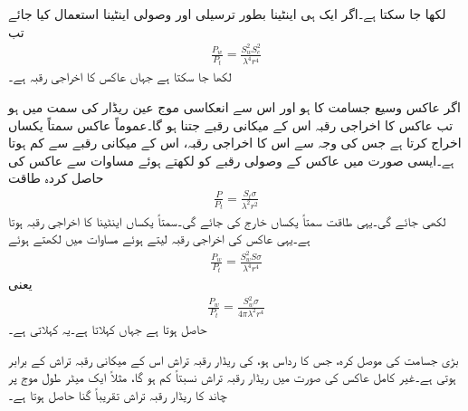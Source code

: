 لکھا جا سکتا ہے۔اگر ایک ہی اینٹینا بطور ترسیلی اور وصولی اینٹینا استعمال کیا جائے تب
\begin{align}\label{مساوات_اینٹینا_فرائس_الف}
\frac{P_w}{P_t}=\frac{S_w^2 S_e^2}{\lambda^4 r^4}
\end{align}
لکھا جا سکتا ہے جہاں عاکس کا اخراجی رقبہ  ہے۔

اگر عاکس وسیع جسامت کا ہو اور اس سے انعکاسی موج عین ریڈار کی سمت میں ہو تب عاکس کا اخراجی رقبہ اس کے میکانی رقبے جتنا ہو گا۔عموماً عاکس سمتاً یکساں اخراج کرتا ہے جس کی وجہ سے اس کا اخراجی رقبہ، اس کے میکانی رقبے سے کم ہوتا ہے۔ایسی صورت میں عاکس کے وصولی رقبے کو  لکھتے ہوئے مساوات  سے عاکس کی حاصل کردہ طاقت
\begin{align}
\frac{P}{P_t}=\frac{S_t \sigma}{\lambda^2 r^2}
\end{align}
لکھی جائے گی۔یہی طاقت سمتاً یکساں خارج کی جائے گی۔سمتاً یکساں اینٹینا کا اخراجی رقبہ  ہوتا ہے۔یہی عاکس کی اخراجی رقبہ لیتے ہوئے مساوات  میں  لکھتے ہوئے
\begin{align}
\frac{P_w}{P_t}=\frac{S_w^2 S \sigma}{\lambda^4 r^4}
\end{align}
یعنی
\begin{align}
\frac{P_w}{P_t}=\frac{S_w^2 \sigma}{4\pi \lambda^2 r^4}
\end{align}
حاصل ہوتا ہے جہاں   کہلاتا ہے۔یہ  کہلاتی ہے۔  

بڑی جسامت کی موصل کرہ، جس کا رداس  ہو،  کی ریڈار رقبہ تراش اس کے میکانی رقبہ تراش  کے برابر ہوتی ہے۔غیر کامل عاکس کی صورت میں ریڈار رقبہ تراش نسبتاً کم ہو گا، مثلاً ایک میٹر طول موج پر چاند کا ریڈار رقبہ تراش تقریباً  گنا حاصل ہوتا ہے۔ 

